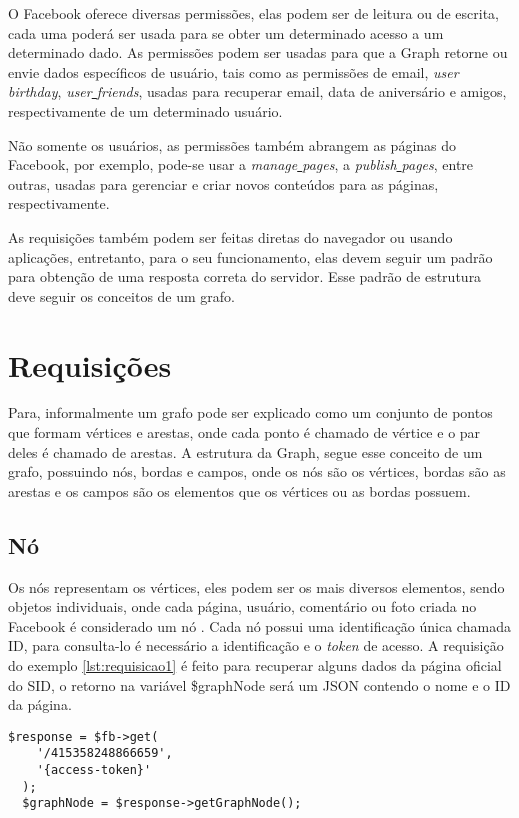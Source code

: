 O Facebook oferece diversas permissões, elas podem ser de leitura ou de escrita, cada uma poderá ser usada para se obter um determinado acesso a um determinado dado. As permissões podem ser usadas para que a Graph retorne ou envie dados específicos de usuário, tais como as permissões de email, \textit{user\underline{{ }}birthday}, \textit{user\underline{{ }}friends}, usadas para recuperar email, data de aniversário e amigos, respectivamente de um determinado usuário.

Não somente os usuários, as permissões também abrangem as páginas do Facebook, por exemplo, pode-se usar a \textit{manage\underline{{ }}pages}, a \textit{publish\underline{{ }}pages}, entre outras, usadas para gerenciar e criar novos conteúdos para as páginas, respectivamente.

As requisições também podem ser feitas diretas do navegador ou usando aplicações, entretanto, para o seu funcionamento, elas devem seguir um padrão para obtenção de uma resposta correta do servidor. Esse padrão de estrutura deve seguir os conceitos de um grafo.

\section{Requisições}

Para\cite{soares2014}, informalmente um grafo pode ser explicado como um conjunto de pontos que formam vértices e arestas, onde cada ponto é chamado de vértice e o par deles é chamado de arestas. A estrutura da Graph, segue esse conceito de um grafo, possuindo nós, bordas e campos, onde os nós são os vértices, bordas são as arestas e os campos são os elementos que os vértices ou as bordas possuem.

\subsection{Nó}
Os nós representam os vértices, eles podem ser os mais diversos elementos, sendo objetos individuais, onde cada página, usuário, comentário ou foto criada no Facebook é considerado um nó \cite{facebook2018b}. Cada nó possui uma identificação única chamada ID, para consulta-lo é necessário a identificação e o \textit{token} de acesso. A requisição do exemplo \ref{lst:requisicao1} é feito para recuperar alguns dados da página oficial do SID, o retorno na variável \$graphNode será um JSON contendo o nome e o ID da página.

\begin{lstlisting}[caption={Requisitando dados básicos de uma página},label={lst:requisicao1}]
  $response = $fb->get(
    '/415358248866659',
    '{access-token}'
  );
  $graphNode = $response->getGraphNode();
\end{lstlisting}

